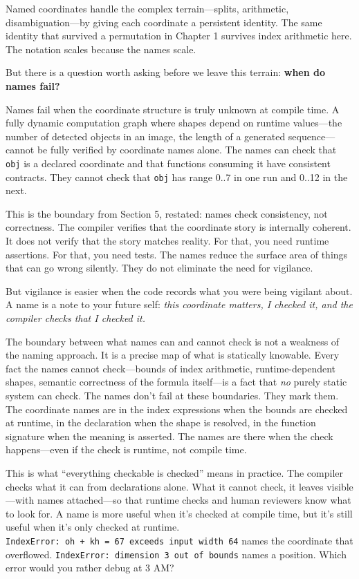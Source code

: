 \documentclass[11pt,titlepage]{article}
\begin{document}
\vspace{2em}

Named coordinates handle the complex terrain---splits, arithmetic,
disambiguation---by giving each coordinate a persistent identity. The
same identity that survived a permutation in Chapter 1 survives index
arithmetic here. The notation scales because the names scale.

But there is a question worth asking before we leave this terrain:
\textbf{when do names fail?}

Names fail when the coordinate structure is truly unknown at compile
time. A fully dynamic computation graph where shapes depend on runtime
values---the number of detected objects in an image, the length of a
generated sequence---cannot be fully verified by coordinate names alone.
The names can check that \texttt{obj} is a declared coordinate and that
functions consuming it have consistent contracts. They cannot check that
\texttt{obj} has range 0..7 in one run and 0..12 in the next.

This is the boundary from Section 5, restated: names check consistency,
not correctness. The compiler verifies that the coordinate story is
internally coherent. It does not verify that the story matches reality.
For that, you need runtime assertions. For that, you need tests. The
names reduce the surface area of things that can go wrong silently. They
do not eliminate the need for vigilance.

But vigilance is easier when the code records what you were being
vigilant about. A name is a note to your future self: \emph{this
coordinate matters, I checked it, and the compiler checks that I checked
it.}

The boundary between what names can and cannot check is not a weakness
of the naming approach. It is a precise map of what is statically
knowable. Every fact the names cannot check---bounds of index
arithmetic, runtime-dependent shapes, semantic correctness of the
formula itself---is a fact that \emph{no} purely static system can
check. The names don't fail at these boundaries. They mark them. The
coordinate names are in the index expressions when the bounds are
checked at runtime, in the declaration when the shape is resolved, in
the function signature when the meaning is asserted. The names are there
when the check happens---even if the check is runtime, not compile time.

This is what ``everything checkable is checked'' means in practice. The
compiler checks what it can from declarations alone. What it cannot
check, it leaves visible---with names attached---so that runtime checks
and human reviewers know what to look for. A name is more useful when
it's checked at compile time, but it's still useful when it's only
checked at runtime.
\texttt{IndexError:\ oh\ +\ kh\ =\ 67\ exceeds\ input\ width\ 64} names
the coordinate that overflowed.
\texttt{IndexError:\ dimension\ 3\ out\ of\ bounds} names a position.
Which error would you rather debug at 3 AM?
\end{document}
